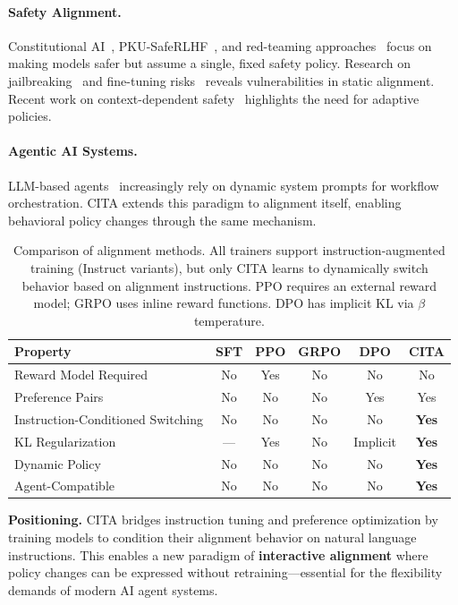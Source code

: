 \paragraph{Safety Alignment.} Constitutional AI~\cite{bai2022constitutional}, PKU-SafeRLHF~\cite{ji2024pku}, and red-teaming approaches~\cite{perez2022red,ganguli2022red} focus on making models safer but assume a single, fixed safety policy. Research on jailbreaking~\cite{zou2023universal,wei2023jailbroken,liu2023jailbreaking} and fine-tuning risks~\cite{qi2023fine,huang2023catastrophic} reveals vulnerabilities in static alignment. Recent work on context-dependent safety~\cite{bianchi2024safetytuned} highlights the need for adaptive policies.

\paragraph{Agentic AI Systems.} LLM-based agents~\cite{wang2024survey,xi2023rise} increasingly rely on dynamic system prompts for workflow orchestration. CITA extends this paradigm to alignment itself, enabling behavioral policy changes through the same mechanism.

\vspace{-2mm}
\begin{table}[H]
\centering
\footnotesize
\begin{tabularx}{\columnwidth}{@{}Xccccc@{}}
\toprule
\textbf{Property} & \textbf{SFT} & \textbf{PPO} & \textbf{GRPO} & \textbf{DPO} & \textbf{CITA} \\
\midrule
Reward Model Required & No & Yes & No & No & No \\
\hline
Preference Pairs & No & No & No & Yes & Yes \\
\hline
Instruction-Conditioned Switching & No & No & No & No & \textbf{Yes} \\
\hline
KL Regularization & --- & Yes & No & Implicit & \textbf{Yes} \\
\hline
Dynamic Policy & No & No & No & No & \textbf{Yes} \\
\hline
Agent-Compatible & No & No & No & No & \textbf{Yes} \\
\bottomrule
\end{tabularx}
\caption{Comparison of alignment methods. All trainers support instruction-augmented training (Instruct variants), but only CITA learns to dynamically switch behavior based on alignment instructions. PPO requires an external reward model; GRPO uses inline reward functions. DPO has implicit KL via $\beta$ temperature.}
\label{tab:method_comparison}
\vspace{-4mm}
\end{table}

\textbf{Positioning.} CITA bridges instruction tuning and preference optimization by training models to condition their alignment behavior on natural language instructions. This enables a new paradigm of \textbf{interactive alignment} where policy changes can be expressed without retraining---essential for the flexibility demands of modern AI agent systems.
